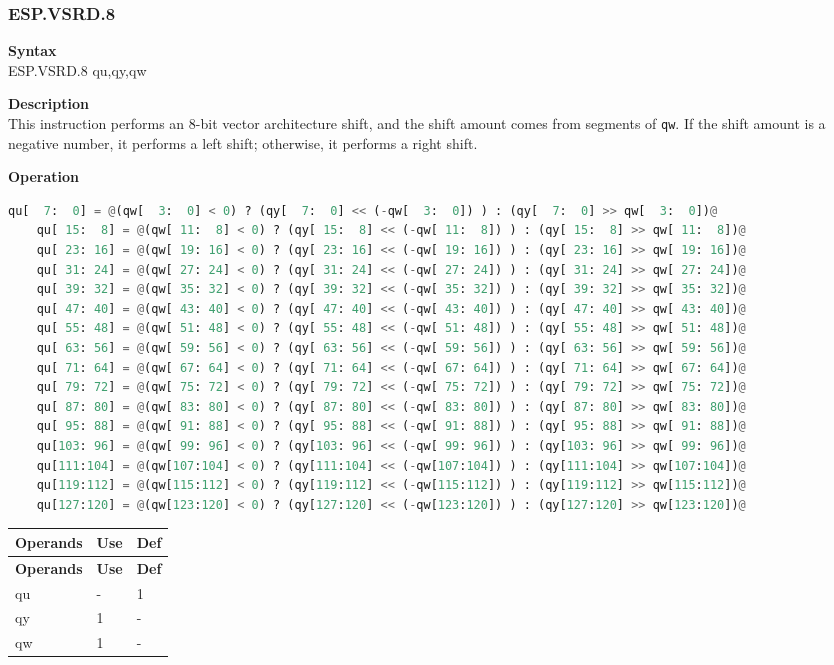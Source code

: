 \newpage
\subsubsection{ESP.VSRD.8}\label{instruction:ESPVSrd8}
\textbf{Syntax}\\
ESP.VSRD.8 qu,qy,qw

\textbf{Description}\\
This instruction performs an 8-bit vector architecture shift, and the shift amount comes from segments of \lstinline{qw}. If the shift amount is a negative number, it performs a left shift; otherwise, it performs a right shift.

\textbf{Operation}\\
\begin{lstlisting}[language=Python, escapechar=@]
    qu[  7:  0] = @(qw[  3:  0] < 0) ? (qy[  7:  0] << (-qw[  3:  0]) ) : (qy[  7:  0] >> qw[  3:  0])@
    qu[ 15:  8] = @(qw[ 11:  8] < 0) ? (qy[ 15:  8] << (-qw[ 11:  8]) ) : (qy[ 15:  8] >> qw[ 11:  8])@
    qu[ 23: 16] = @(qw[ 19: 16] < 0) ? (qy[ 23: 16] << (-qw[ 19: 16]) ) : (qy[ 23: 16] >> qw[ 19: 16])@
    qu[ 31: 24] = @(qw[ 27: 24] < 0) ? (qy[ 31: 24] << (-qw[ 27: 24]) ) : (qy[ 31: 24] >> qw[ 27: 24])@
    qu[ 39: 32] = @(qw[ 35: 32] < 0) ? (qy[ 39: 32] << (-qw[ 35: 32]) ) : (qy[ 39: 32] >> qw[ 35: 32])@
    qu[ 47: 40] = @(qw[ 43: 40] < 0) ? (qy[ 47: 40] << (-qw[ 43: 40]) ) : (qy[ 47: 40] >> qw[ 43: 40])@
    qu[ 55: 48] = @(qw[ 51: 48] < 0) ? (qy[ 55: 48] << (-qw[ 51: 48]) ) : (qy[ 55: 48] >> qw[ 51: 48])@
    qu[ 63: 56] = @(qw[ 59: 56] < 0) ? (qy[ 63: 56] << (-qw[ 59: 56]) ) : (qy[ 63: 56] >> qw[ 59: 56])@
    qu[ 71: 64] = @(qw[ 67: 64] < 0) ? (qy[ 71: 64] << (-qw[ 67: 64]) ) : (qy[ 71: 64] >> qw[ 67: 64])@
    qu[ 79: 72] = @(qw[ 75: 72] < 0) ? (qy[ 79: 72] << (-qw[ 75: 72]) ) : (qy[ 79: 72] >> qw[ 75: 72])@
    qu[ 87: 80] = @(qw[ 83: 80] < 0) ? (qy[ 87: 80] << (-qw[ 83: 80]) ) : (qy[ 87: 80] >> qw[ 83: 80])@
    qu[ 95: 88] = @(qw[ 91: 88] < 0) ? (qy[ 95: 88] << (-qw[ 91: 88]) ) : (qy[ 95: 88] >> qw[ 91: 88])@
    qu[103: 96] = @(qw[ 99: 96] < 0) ? (qy[103: 96] << (-qw[ 99: 96]) ) : (qy[103: 96] >> qw[ 99: 96])@
    qu[111:104] = @(qw[107:104] < 0) ? (qy[111:104] << (-qw[107:104]) ) : (qy[111:104] >> qw[107:104])@
    qu[119:112] = @(qw[115:112] < 0) ? (qy[119:112] << (-qw[115:112]) ) : (qy[119:112] >> qw[115:112])@
    qu[127:120] = @(qw[123:120] < 0) ? (qy[127:120] << (-qw[123:120]) ) : (qy[127:120] >> qw[123:120])@
\end{lstlisting}

\begin{longtable}[c]{|l|l|l|}
    \hline
    \rowcolor{lightgray}
    \textbf{Operands} & \textbf{Use} & \textbf{Def} \\\hline
    \endfirsthead
    \rowcolor{lightgray}
     \textbf{Operands} & \textbf{Use} & \textbf{Def} \\\hline
    \endhead
    \endfoot

  qu & - & 1 \\\hline
  qy & 1 & - \\\hline
  qw & 1 & - \\\hline

\end{longtable}


